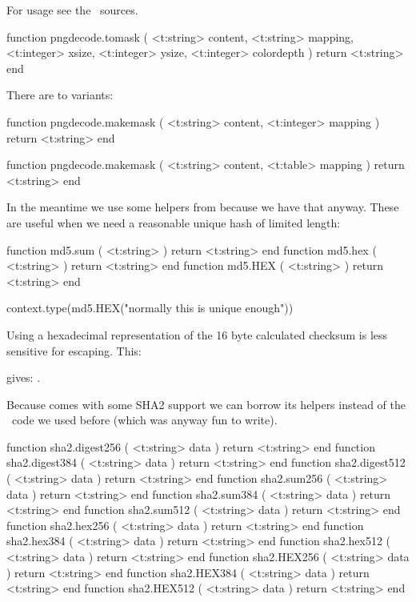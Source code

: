 For usage see the \CONTEXT\ sources.

\starttyping[option=LUA]
function pngdecode.tomask (
    <t:string>  content,
    <t:string>  mapping,
    <t:integer> xsize,
    <t:integer> ysize,
    <t:integer> colordepth
)
    return <t:string>
end
\stoptyping

There are to variants:

\starttyping[option=LUA]
function pngdecode.makemask (
    <t:string>  content,
    <t:integer> mapping
)
    return <t:string>
end

function pngdecode.makemask (
    <t:string> content,
    <t:table>  mapping
)
    return <t:string>
end
\stoptyping

\stopsubsection

\startsubsection[title=MD5 hashing]

In the meantime we use some helpers from  because we have that
anyway. These are useful when we need a reasonable unique hash of limited length:

\starttyping[option=LUA]
function md5.sum ( <t:string> ) return <t:string> end
function md5.hex ( <t:string> ) return <t:string> end
function md5.HEX ( <t:string> ) return <t:string> end
\stoptyping

\startbuffer
\startluacode
context.type(md5.HEX("normally this is unique enough"))
\stopluacode
\stopbuffer

Using a hexadecimal representation of the 16 byte calculated checksum is less
sensitive for escaping. This:

\typebuffer

gives: \inlinebuffer.

\stopsubsection

\startsubsection[title=SHA2 hashing]

Because  comes with some SHA2 support we can borrow its helpers
instead of the \LUA\ code we used before (which was anyway fun to write).

\starttyping[option=LUA]
function sha2.digest256 ( <t:string> data ) return <t:string> end
function sha2.digest384 ( <t:string> data ) return <t:string> end
function sha2.digest512 ( <t:string> data ) return <t:string> end
function sha2.sum256    ( <t:string> data ) return <t:string> end
function sha2.sum384    ( <t:string> data ) return <t:string> end
function sha2.sum512    ( <t:string> data ) return <t:string> end
function sha2.hex256    ( <t:string> data ) return <t:string> end
function sha2.hex384    ( <t:string> data ) return <t:string> end
function sha2.hex512    ( <t:string> data ) return <t:string> end
function sha2.HEX256    ( <t:string> data ) return <t:string> end
function sha2.HEX384    ( <t:string> data ) return <t:string> end
function sha2.HEX512    ( <t:string> data ) return <t:string> end
\stoptyping

